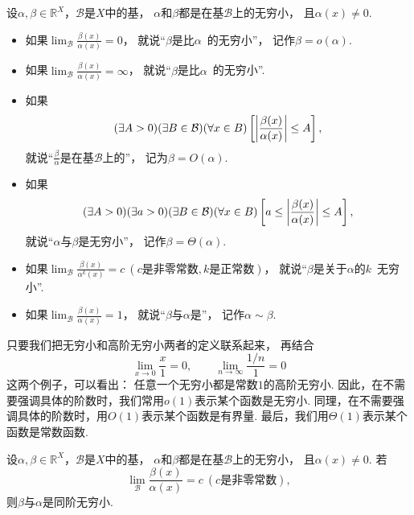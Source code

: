 \begin{definition}\label{definition:无穷小和无穷大.无穷小的比较}
设\(\alpha,\beta\in\mathbb{R}^X\)，\(\mathcal{B}\)是\(X\)中的基，
\(\alpha\)和\(\beta\)都是在基\(\mathcal{B}\)上的无穷小，
且\(\alpha(x)\neq0\).
\newcommand{\lf}[1][]{\lim_\mathcal{B} \frac{\beta(x)}{\alpha^{#1}(x)}}
\begin{itemize}
	\item 如果\(\lf=0\)，
	就说“\(\beta\)是比\(\alpha\)~的无穷小”，
	记作\(\beta=o(\alpha)\).

	\item 如果\(\lf=\infty\)，
	就说“\(\beta\)是比\(\alpha\)~的无穷小”.

	\item 如果\[
		(\exists A>0)
		(\exists B\in\mathcal{B})
		(\forall x\in B)
		\left[
			\abs{\frac{\beta(x)}{\alpha(x)}} \leq A
		\right],
	\]
	就说“\(\frac\beta\alpha\)是在基\(\mathcal{B}\)上的”，
	记为\(\beta = O(\alpha)\).

	\item 如果\[
		(\exists A>0)
		(\exists a>0)
		(\exists B\in\mathcal{B})
		(\forall x\in B)
		\left[
			a \leq \abs{\frac{\beta(x)}{\alpha(x)}} \leq A
		\right],
	\]
	就说“\(\alpha\)与\(\beta\)是无穷小”，
	记作\(\beta = \Theta(\alpha)\).

	\item 如果\(\lf[k]=c\ (\text{$c$是非零常数},\text{$k$是正常数})\)，
	就说“\(\beta\)是关于\(\alpha\)的\(k\)~无穷小”.

	\item 如果\(\lf=1\)，
	就说“\(\beta\)与\(\alpha\)是”，
	记作\(\alpha\sim\beta\).
\end{itemize}
\end{definition}
\begin{remark}
只要我们把无穷小和高阶无穷小两者的定义联系起来，
再结合\[
	\lim_{x\to0} \frac{x}{1} = 0,
	\qquad
	\lim_{n\to\infty} \frac{1/n}{1} = 0
\]这两个例子，可以看出：
任意一个无穷小都是常数\(1\)的高阶无穷小.
因此，在不需要强调具体的阶数时，我们常用\(o(1)\)表示某个函数是无穷小.
同理，在不需要强调具体的阶数时，用\(O(1)\)表示某个函数是有界量.
最后，我们用\(\Theta(1)\)表示某个函数是常数函数.
\end{remark}

\begin{proposition}
设\(\alpha,\beta\in\mathbb{R}^X\)，\(\mathcal{B}\)是\(X\)中的基，
\(\alpha\)和\(\beta\)都是在基\(\mathcal{B}\)上的无穷小，
且\(\alpha(x)\neq0\).
若\[
	\lim_\mathcal{B} \frac{\beta(x)}{\alpha(x)} = c\ (\text{$c$是非零常数}),
\]
则\(\beta\)与\(\alpha\)是同阶无穷小.
\end{proposition}

